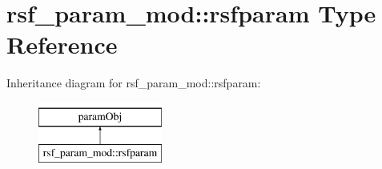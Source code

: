 \hypertarget{structrsf__param__mod_1_1rsfparam}{}\section{rsf\+\_\+param\+\_\+mod\+:\+:rsfparam Type Reference}
\label{structrsf__param__mod_1_1rsfparam}
Inheritance diagram for rsf\+\_\+param\+\_\+mod\+:\+:rsfparam\+:\begin{figure}[H]
\begin{center}
\leavevmode
\includegraphics[height=2.000000cm]{structrsf__param__mod_1_1rsfparam}
\end{center}
\end{figure}
